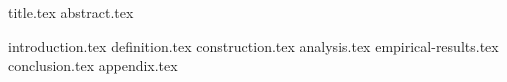 \documentclass[11pt]{llncs}
\begin{document}
{title.tex}
\thispagestyle{plain}
{abstract.tex}

{introduction.tex}
{definition.tex}
{construction.tex}
{analysis.tex}
{empirical-results.tex}
{conclusion.tex}
\appendix
{appendix.tex}



\end{document}
